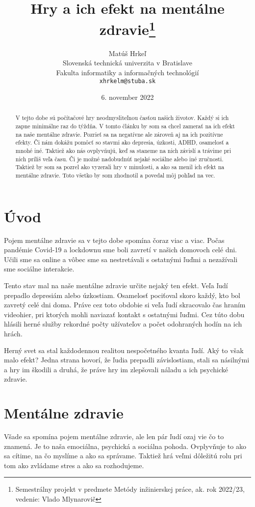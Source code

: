 \documentclass[10pt,oneside,slovak,a4paper]{article}
\title{Hry a ich efekt na mentálne zdravie\thanks{Semestrálny projekt v predmete Metódy inžinierskej práce, ak. rok 2022/23, vedenie: Vlado Mlynarovič}} %
\author{Matúš Hrkeľ\\[2pt]
	{\small Slovenská technická univerzita v Bratislave}\\
	{\small Fakulta informatiky a informačných technológií}\\
	{\small \texttt{xhrkelm@stuba.sk}}
	}
\date{\small 6. november 2022} %
\begin{document}
\maketitle

\begin{abstract}
V tejto dobe sú počítačové hry neodmysliteľnou časťou našich životov. Každý si ich zapne minimálne raz do týždňa. V tomto článku by som sa chcel zamerať na ich efekt na naše mentálne zdravie. Pozrieť sa na negatívne ale zároveň aj na ich pozitívne efekty. Či nám dokážu pomôcť so stavmi ako depresia, úzkosti, ADHD, osamelosť a mnohé iné. Taktiež ako nás ovplyvňujú, keď sa staneme na nich závislí a trávime pri nich príliš veľa času. Či je možné nadobudnúť nejaké sociálne alebo iné zručnosti. Taktiež by som sa pozrel ako vyzerali hry v minulosti, a ako sa menil ich efekt na mentálne zdravie. Toto všetko by som zhodnotil a povedal môj pohľad na vec.
\end{abstract}
\newpage

\section{Úvod}

Pojem mentálne zdravie sa v tejto dobe spomína čoraz viac a viac. Počas pandémie Covid-19 a lockdownu sme boli zavretí v našich domovoch celé dni. Učili sme sa online a vôbec sme sa nestretávali s ostatnými ľuďmi a nezažívali sme sociálne interakcie. 

Tento stav mal na naše mentálne zdravie určite nejaký ten efekt. Veľa ľudí prepadlo depresiám alebo úzkostiam. Osamelosť pociťoval skoro každý, kto bol zavretý celé dni doma. Práve cez toto obdobie si veľa ľudí skracovalo čas hraním videohier, pri ktorých mohli naviazať kontakt s ostatnými ľuďmi. Cez túto dobu hlásili herné služby rekordné počty užívateľov a počet odohraných hodín na ich hrách. \cite{steam}

Herný svet sa stal každodennou realitou nespočetného kvanta ľudí. Aký to však malo efekt? Jedna strana hovorí, že ľudia prepadli závislostiam, stali sa násilnými a hry im škodili a druhá, že práve hry im zlepšovali náladu a ich psychické zdravie. 



\section{Mentálne zdravie} \label{Mentalne Zdravie}

Všade sa spomína pojem mentálne zdravie, ale len pár ľudí ozaj vie čo to znamená. Je to naša emociálna, psychická a sociálna pohoda. Ovplyvňuje to ako sa cítime, na čo myslíme a ako sa správame. Taktiež hrá veľmi dôležitú rolu pri tom ako zvládame stres a ako sa rozhodujeme. 
\end{document}
